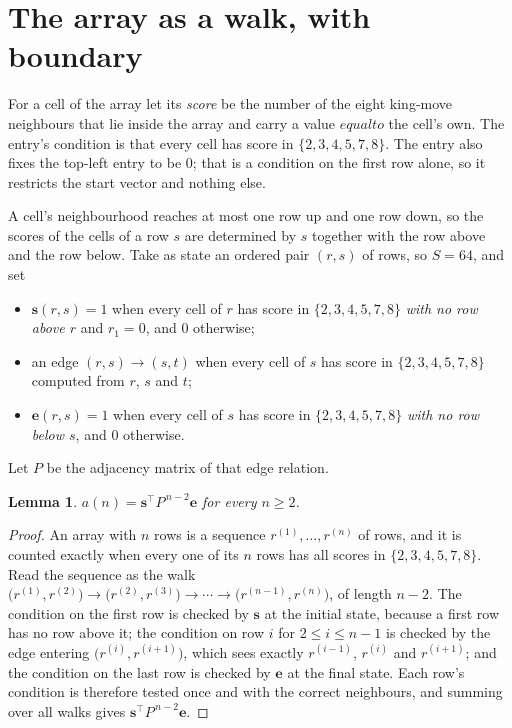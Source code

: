 \documentclass[11pt,a4paper]{article}
\theoremstyle{plain}
\newtheorem{lemma}[theorem]{Lemma}
\theoremstyle{definition}
\begin{document}
\section{The array as a walk, with boundary}

For a cell of the array let its \emph{score} be the number of the eight king-move neighbours that lie inside
the array and carry a value $equal to$ the cell's own. The entry's condition is that every cell
has score in $\{2,3,4,5,7,8\}$. The entry also fixes the top-left entry to be $0$; that is a condition on the first row alone, so it restricts the start vector and nothing else.

A cell's neighbourhood reaches at most one row up and one row down, so the scores of the
cells of a row $s$ are determined by $s$ together with the row above and the row below.
Take as state an ordered pair $(r,s)$ of rows, so $S=64$, and set
\begin{itemize}
\item $\mathbf{s}(r,s)=1$ when every cell of $r$ has score in $\{2,3,4,5,7,8\}$ \emph{with no row
above $r$} and $r_1=0$, and $0$ otherwise;
\item an edge $(r,s)\to(s,t)$ when every cell of $s$ has score in $\{2,3,4,5,7,8\}$ computed from
$r$, $s$ and $t$;
\item $\mathbf{e}(r,s)=1$ when every cell of $s$ has score in $\{2,3,4,5,7,8\}$ \emph{with no row
below $s$}, and $0$ otherwise.
\end{itemize}
Let $P$ be the adjacency matrix of that edge relation.

\begin{lemma}\label{lem:walk}
$a(n)=\mathbf{s}^{\!\top}P^{\,n-2}\mathbf{e}$ for every $n\ge2$.
\end{lemma}

\begin{proof}
An array with $n$ rows is a sequence $r^{(1)},\dots,r^{(n)}$ of rows, and it is counted
exactly when every one of its $n$ rows has all scores in $\{2,3,4,5,7,8\}$. Read the sequence as the
walk $\bigl(r^{(1)},r^{(2)}\bigr)\to\bigl(r^{(2)},r^{(3)}\bigr)\to\cdots\to
\bigl(r^{(n-1)},r^{(n)}\bigr)$, of length $n-2$. The condition on the first row is
checked by $\mathbf{s}$ at the initial state, because a first row has no row above it; the
condition on row $i$ for $2\le i\le n-1$ is checked by the edge entering
$\bigl(r^{(i)},r^{(i+1)}\bigr)$, which sees exactly $r^{(i-1)}$, $r^{(i)}$ and
$r^{(i+1)}$; and the condition on the last row is checked by $\mathbf{e}$ at the final
state. Each row's condition is therefore tested once and with the correct neighbours, and
summing over all walks gives $\mathbf{s}^{\!\top}P^{\,n-2}\mathbf{e}$.
\end{proof}
\end{document}
